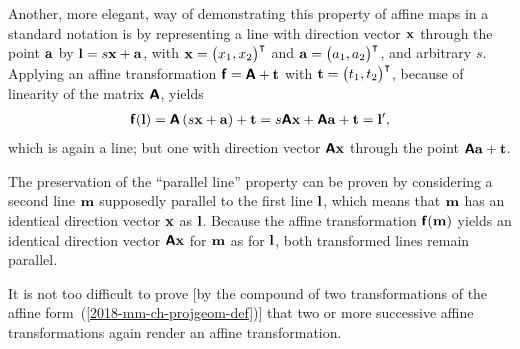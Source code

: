 {Another, more elegant, way of demonstrating this property of affine maps
in a standard notation\cite{Stothers-ag} is
by representing a line with direction vector ${\bf x}$
through the point ${\bf a}$ by ${\bf l}= s {\bf x} + {\bf a}$,
with ${\bf x}= \begin{pmatrix}
x_1,  x_2
\end{pmatrix}^\intercal$
and ${\bf a}= \begin{pmatrix}
a_1,  a_2
\end{pmatrix}^\intercal$, and arbitrary $s$.
Applying an affine transformation
$\textsf{\textbf{f}}= \textsf{\textbf{A}}+ {\bf t}$
with ${\bf t}= \begin{pmatrix}
t_1,  t_2
\end{pmatrix}^\intercal$,
because of linearity of the matrix $\textsf{\textbf{A}}$,
yields
\begin{equation}
\begin{split}
\textsf{\textbf{f}}({\bf l})
=
\textsf{\textbf{A}}\left(s {\bf x} + {\bf a}\right) + {\bf t}
=
 s \textsf{\textbf{A}}{\bf x}
+ \textsf{\textbf{A}}{\bf a} + {\bf t} = {\bf l}',
\end{split}
\label{2018-mm-ch-projgeom-linepap1}
\end{equation}
which is again a line; but one with direction vector $\textsf{\textbf{A}}{\bf x}$
through the point $\textsf{\textbf{A}}{\bf a} + {\bf t}$.

The preservation of the ``parallel line'' property can be proven
by considering a second line
${\bf m}$ supposedly parallel to the first line ${\bf l}$, which means that
${\bf m}$ has an identical direction vector ${\bf x}$ as ${\bf l}$.
Because  the affine transformation $\textsf{\textbf{f}}({\bf m})$
yields an identical direction vector $\textsf{\textbf{A}}{\bf x}$
for ${\bf m}$ as for ${\bf l}$, both transformed lines remain parallel.


\eproof
}


It is not too difficult to prove [by the compound of two transformations
of the affine form~(\ref{2018-mm-ch-projgeom-def})]
that two or more successive affine transformations again render an affine transformation.



